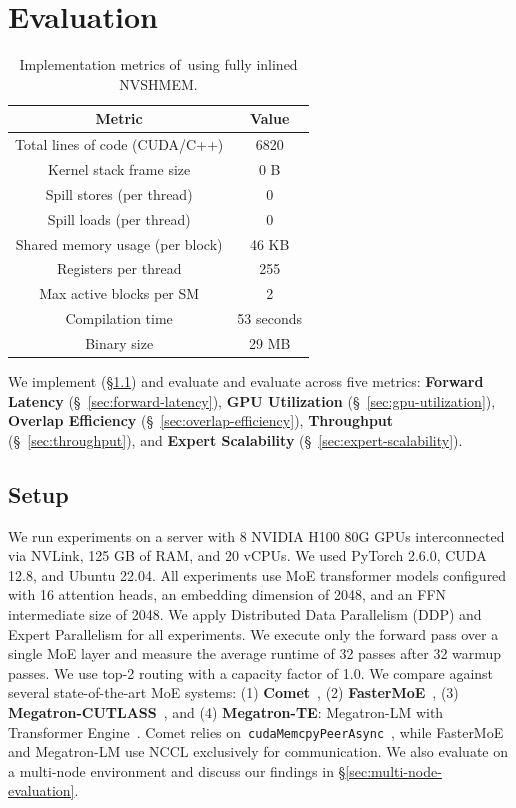 \chapter{Evaluation}\label{ch:evaluation}
\begin{table}[h]
    \centering
    \caption{Implementation metrics of~\sysname using fully inlined NVSHMEM.}
    \label{tab:impl_metrics}
    \begin{tabular}{cc}
        \toprule
        \textbf{Metric} & \textbf{Value}\\ \hline
        Total lines of code (CUDA/C++) & 6820 \\
        Kernel stack frame size & 0 B \\
        Spill stores (per thread) & 0 \\
        Spill loads (per thread) & 0 \\
        Shared memory usage (per block) & 46 KB \\
        Registers per thread & 255 \\
        Max active blocks per SM & 2 \\
        Compilation time & 53 seconds \\
        Binary size & 29 MB\\
    \end{tabular}
\end{table}
We implement (\S\ref{tab:impl_metrics}) and evaluate \sysname and evaluate across
five metrics: \textbf{Forward Latency} (\S~\ref{sec:forward-latency}),
\textbf{GPU Utilization} (\S~\ref{sec:gpu-utilization}),
\textbf{Overlap Efficiency} (\S~\ref{sec:overlap-efficiency}),
\textbf{Throughput} (\S~\ref{sec:throughput}), and \textbf{Expert Scalability} (\S~\ref{sec:expert-scalability}).
\section{Setup}\label{sec:setup}
We run experiments on a server with 8 NVIDIA H100 80G GPUs interconnected via NVLink,
125 GB of RAM, and 20 vCPUs. We used PyTorch 2.6.0, CUDA 12.8, and Ubuntu 22.04.
All experiments use MoE transformer models configured with 16 attention heads,
an embedding dimension of 2048, and an FFN intermediate size of 2048.
We apply Distributed Data Parallelism (DDP) and Expert Parallelism for all experiments.
We execute only the forward pass over a single MoE layer and measure the average runtime
of 32 passes after 32 warmup passes.
We use top-2 routing with a capacity factor of 1.0.
We compare \sysname against several state-of-the-art MoE systems:
(1) \textbf{Comet}~\cite{comet},
(2) \textbf{FasterMoE}~\cite{fastermoe},
(3) \textbf{Megatron-CUTLASS}~\cite{megatron-lm}, and
(4) \textbf{Megatron-TE}: Megatron-LM with Transformer Engine~\cite{transformer-engine}.
Comet relies on~\verb|cudaMemcpyPeerAsync|~\cite{fluxp2p}, while FasterMoE and Megatron-LM use NCCL exclusively for communication.
We also evaluate \sysname on a multi-node environment and discuss our findings in \S\ref{sec:multi-node-evaluation}.
